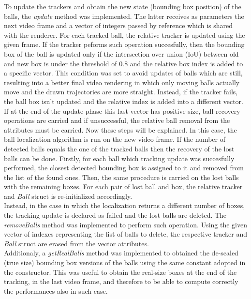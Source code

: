 To update the trackers and obtain the new state (bounding box position) of the balls, the \textit{update} method was implemented. The latter receives as parameters the next 
video frame and a vector of integers passed by reference which is shared with the renderer. For each tracked ball, the relative tracker is updated using the given frame.
If the tracker peforms such operation succesfully, then the bounding box of the ball is updated only if the intersection over union (IoU) between old and new box is under
the threshold of $0.8$ and the relative box index is added to a specific vector. This condition was set to avoid updates of balls which are still, resulting into a better final video rendering in which only moving balls actually move
and the drawn trajectories are more straight. Instead, if the tracker fails, the ball box isn't updated and the relative index is added into a different vector.
\newline \\
If at the end of the update phase this last vector has positive size, ball recovery operations are carried and if unsuccessful, the relative ball removal from the attributes 
must be carried. Now these steps will be explained. In this case, the ball localization algorithm is run on the new video frame. If the number of detected balls equals the one
of the tracked balls then the recovery of the lost balls can be done. Firstly, for each ball which tracking update was succesfully performed, the closest detected bounding box
is assigned to it and removed from the list of the found ones. Then, the same procedure is carried on the lost balls with the remaining boxes. For each pair of lost ball and box,
the relative tracker and \textit{Ball} struct is re-initialized accordingly.
\newline \\
Instead, in the case in which the localization returns a different number of boxes, the tracking update is declared as failed and the lost balls are deleted. 
The \textit{removeBalls} method was implemented to perform such operation. Using the given vector of indexes representing the list of balls to delete, the respective
tracker and \textit{Ball} struct are erased from the vector attributes.
\newline \\
Additionaly, a \textit{getRealBalls} method was implemented to obtained the de-scaled (true size) bounding box versions of the balls using the same constant adopted in
the constructor. This was useful to obtain the real-size boxes at the end of the tracking, in the last video frame, and therefore to be able to compute correctly
the performances also in such case.